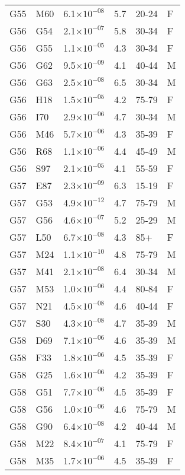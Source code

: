 \begin{longtable}{lllrll}
   G55 & M60 & 6.1$\times10^{-08}$ & 5.7 & 20-24 & F \\ 
   G56 & G54 & 2.1$\times10^{-07}$ & 5.8 & 30-34 & F \\ 
   G56 & G55 & 1.1$\times10^{-05}$ & 4.3 & 30-34 & F \\ 
   G56 & G62 & 9.5$\times10^{-09}$ & 4.1 & 40-44 & M \\ 
   G56 & G63 & 2.5$\times10^{-08}$ & 6.5 & 30-34 & M \\ 
   G56 & H18 & 1.5$\times10^{-05}$ & 4.2 & 75-79 & F \\ 
   G56 & I70 & 2.9$\times10^{-06}$ & 4.7 & 30-34 & M \\ 
   G56 & M46 & 5.7$\times10^{-06}$ & 4.3 & 35-39 & F \\ 
   G56 & R68 & 1.1$\times10^{-06}$ & 4.4 & 45-49 & M \\ 
   G56 & S97 & 2.1$\times10^{-05}$ & 4.1 & 55-59 & F \\ 
   G57 & E87 & 2.3$\times10^{-09}$ & 6.3 & 15-19 & F \\ 
   G57 & G53 & 4.9$\times10^{-12}$ & 4.7 & 75-79 & M \\ 
   G57 & G56 & 4.6$\times10^{-07}$ & 5.2 & 25-29 & M \\ 
   G57 & L50 & 6.7$\times10^{-08}$ & 4.3 & 85+ & F \\ 
   G57 & M24 & 1.1$\times10^{-10}$ & 4.8 & 75-79 & M \\ 
   G57 & M41 & 2.1$\times10^{-08}$ & 6.4 & 30-34 & M \\ 
   G57 & M53 & 1.0$\times10^{-06}$ & 4.4 & 80-84 & F \\ 
   G57 & N21 & 4.5$\times10^{-08}$ & 4.6 & 40-44 & F \\ 
   G57 & S30 & 4.3$\times10^{-08}$ & 4.7 & 35-39 & M \\ 
   G58 & D69 & 7.1$\times10^{-06}$ & 4.6 & 35-39 & M \\ 
   G58 & F33 & 1.8$\times10^{-06}$ & 4.5 & 35-39 & F \\ 
   G58 & G25 & 1.6$\times10^{-06}$ & 4.2 & 35-39 & F \\ 
   G58 & G51 & 7.7$\times10^{-06}$ & 4.5 & 35-39 & F \\ 
   G58 & G56 & 1.0$\times10^{-06}$ & 4.6 & 75-79 & M \\ 
   G58 & G90 & 6.4$\times10^{-08}$ & 4.2 & 40-44 & M \\ 
   G58 & M22 & 8.4$\times10^{-07}$ & 4.1 & 75-79 & F \\ 
   G58 & M35 & 1.7$\times10^{-06}$ & 4.5 & 35-39 & F \\ 

\end{longtable}
